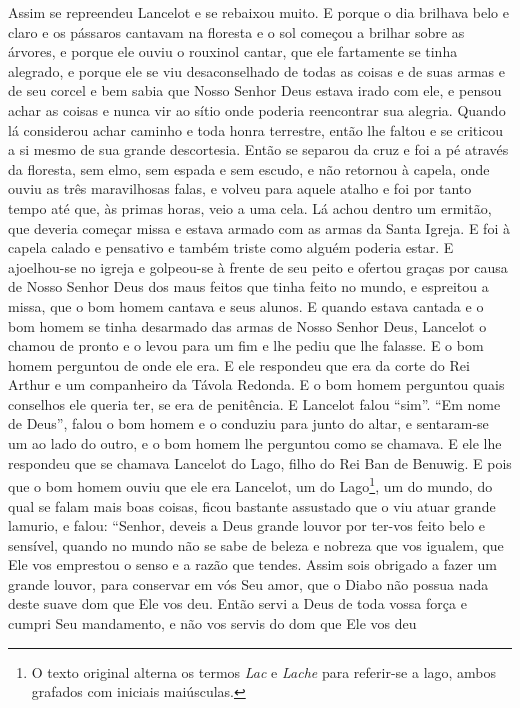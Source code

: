 Assim se repreendeu Lancelot e se rebaixou muito. E porque o dia brilhava belo
e claro e os pássaros cantavam na floresta e o sol começou a brilhar sobre as
árvores, e porque ele ouviu o rouxinol cantar, que ele fartamente se tinha
alegrado, e porque ele se viu desaconselhado de todas as coisas e de suas armas
e de seu corcel e bem sabia que Nosso Senhor Deus estava irado com ele, e
pensou achar as coisas e nunca vir ao sítio onde poderia reencontrar sua
alegria. Quando lá considerou achar caminho e toda honra terrestre,
então lhe faltou e se criticou a si mesmo de sua grande descortesia. 
Então se separou da cruz e foi a pé através da floresta, sem elmo, sem
espada e sem escudo, e não retornou à capela, onde ouviu as três maravilhosas
falas, e volveu para aquele atalho e foi por tanto tempo até que, às primas
horas, veio a uma cela. Lá achou dentro um ermitão, que deveria começar missa e
estava armado com as armas da Santa Igreja. E foi à capela calado e pensativo e
também triste como alguém poderia estar. E ajoelhou-se no igreja e golpeou-se à
frente de seu peito e ofertou graças por causa de Nosso Senhor Deus dos maus
feitos que tinha feito no mundo, e espreitou a missa, que o bom homem cantava e
seus alunos. E quando estava cantada e o bom homem se tinha desarmado das armas
de Nosso Senhor Deus, Lancelot o chamou de pronto e o levou para um fim e lhe
pediu que lhe falasse. E o bom homem perguntou de onde ele era. E ele respondeu
que era da corte do Rei Arthur e um companheiro da Távola Redonda. E o bom homem
perguntou quais conselhos ele queria ter, se era de penitência. E Lancelot
falou “sim”. “Em nome de Deus”, falou o bom homem e o conduziu para junto do
altar, e sentaram-se um ao lado do outro, e o bom homem lhe perguntou como se
chamava. E ele lhe respondeu que se chamava Lancelot do Lago, filho do Rei Ban
de Benuwig. E pois que o bom homem ouviu que ele era Lancelot, um do
Lago\footnote{ O texto original alterna os termos \textit{Lac }e \textit{Lache}
para referir-se a lago, ambos grafados com iniciais maiúsculas.}, 
um do mundo, do qual se falam mais boas coisas, ficou bastante assustado que o
viu atuar grande lamurio, e falou: “Senhor, deveis a Deus grande louvor por
ter-vos feito belo e sensível, quando no mundo não se sabe de beleza e nobreza
que vos igualem, que Ele vos emprestou o senso e a razão que tendes. Assim sois
obrigado a fazer um grande louvor, para conservar em vós Seu amor,  que o Diabo
não possua nada deste suave dom que Ele vos deu. Então servi a Deus de toda
vossa força e cumpri Seu mandamento, e não vos servis do dom que Ele vos deu
